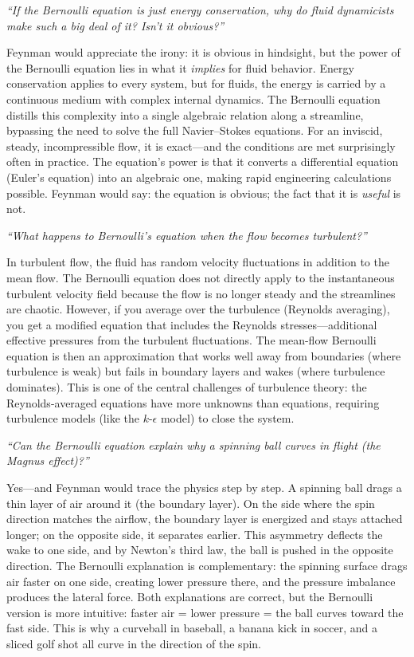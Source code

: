 \documentclass[11pt,openright]{book}
\begin{document}
\textit{``If the Bernoulli equation is just energy conservation, why do fluid dynamicists make such a big deal of it? Isn't it obvious?''}

Feynman would appreciate the irony: it is obvious in hindsight, but the power of the Bernoulli equation lies in what it \emph{implies} for fluid behavior. Energy conservation applies to every system, but for fluids, the energy is carried by a continuous medium with complex internal dynamics. The Bernoulli equation distills this complexity into a single algebraic relation along a streamline, bypassing the need to solve the full Navier--Stokes equations. For an inviscid, steady, incompressible flow, it is exact---and the conditions are met surprisingly often in practice. The equation's power is that it converts a differential equation (Euler's equation) into an algebraic one, making rapid engineering calculations possible. Feynman would say: the equation is obvious; the fact that it is \emph{useful} is not.

\textit{``What happens to Bernoulli's equation when the flow becomes turbulent?''}

In turbulent flow, the fluid has random velocity fluctuations in addition to the mean flow. The Bernoulli equation does not directly apply to the instantaneous turbulent velocity field because the flow is no longer steady and the streamlines are chaotic. However, if you average over the turbulence (Reynolds averaging), you get a modified equation that includes the Reynolds stresses---additional effective pressures from the turbulent fluctuations. The mean-flow Bernoulli equation is then an approximation that works well away from boundaries (where turbulence is weak) but fails in boundary layers and wakes (where turbulence dominates). This is one of the central challenges of turbulence theory: the Reynolds-averaged equations have more unknowns than equations, requiring turbulence models (like the $k$-$\epsilon$ model) to close the system.

\textit{``Can the Bernoulli equation explain why a spinning ball curves in flight (the Magnus effect)?''}

Yes---and Feynman would trace the physics step by step. A spinning ball drags a thin layer of air around it (the boundary layer). On the side where the spin direction matches the airflow, the boundary layer is energized and stays attached longer; on the opposite side, it separates earlier. This asymmetry deflects the wake to one side, and by Newton's third law, the ball is pushed in the opposite direction. The Bernoulli explanation is complementary: the spinning surface drags air faster on one side, creating lower pressure there, and the pressure imbalance produces the lateral force. Both explanations are correct, but the Bernoulli version is more intuitive: faster air = lower pressure = the ball curves toward the fast side. This is why a curveball in baseball, a banana kick in soccer, and a sliced golf shot all curve in the direction of the spin.
\end{document}
